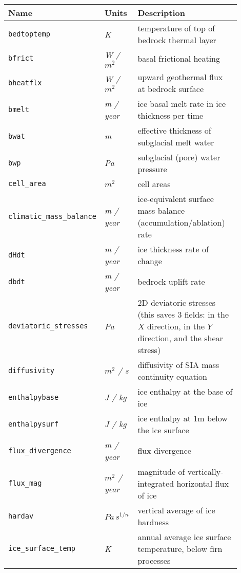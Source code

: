 \begin{table}[ht]
  \centering
  \begin{tabular}{p{0.15\linewidth}p{0.15\linewidth}p{0.6\linewidth}}
    \toprule
    \textbf{Name} & \textbf{Units} & \textbf{Description} \\
    \midrule
    \texttt{bedtoptemp} & \textsl{K} & temperature of top of bedrock thermal layer \\
    \texttt{bfrict} & \textsl{W  / $m^2$} &  basal frictional heating \\
    \texttt{bheatflx} & \textsl{W  / $m^2$} & upward geothermal flux at bedrock surface \\
    \texttt{bmelt} & \textsl{m / year} & ice basal melt rate in ice thickness per time \\
    \texttt{bwat} & \textsl{m} & effective thickness of subglacial melt water \\
    \texttt{bwp} & \textsl{Pa} & subglacial (pore) water pressure \\
    \texttt{cell_area} & \textsl{$m^{2}$} & cell areas \\
    \texttt{climatic_mass_balance} & \textsl{m / year} & ice-equivalent surface mass balance (accumulation/ablation) rate \\
    \texttt{dHdt} & \textsl{m / year} &  ice thickness rate of change \\
    \texttt{dbdt} & \textsl{m / year} & bedrock uplift rate \\
    \texttt{deviatoric_stresses} & \textsl{Pa} & 2D deviatoric stresses (this saves 3 fields: in the $X$ direction, in the $Y$ direction, and the shear stress) \\
    \texttt{diffusivity} & \textsl{$m^{2}$  / s} &  diffusivity of SIA mass continuity equation \\
    \texttt{enthalpybase} & \textsl{J  / kg} &  ice enthalpy at the base of ice \\
    \texttt{enthalpysurf} & \textsl{J  / kg} &  ice enthalpy at 1m below the ice surface \\
    \texttt{flux_divergence} & \textsl{m / year} &  flux divergence \\
    \texttt{flux_mag} & \textsl{$m^{2}$ / year} &  magnitude of vertically-integrated horizontal flux of ice \\
    \texttt{hardav} & $Pa\, s^{1/n}$ &  vertical average of ice hardness \\
    \texttt{ice_surface_temp} & \textsl{K} & annual average ice surface temperature, below firn processes \\

\end{tabular}
\end{table}
